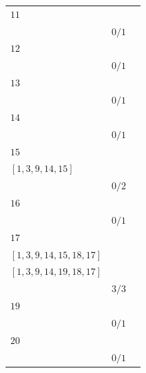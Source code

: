 \documentclass[12pt, a4paper]{extarticle}
\begin{document}
\begin{table}[h!]
\begin{tabularx}{\textwidth}{|X|X|X|}
        \hline
        $11$ & \begin{tabular}{@{}l@{}} $[1, 3, 6, 10, 11]$ \\ \end{tabular} & $0/1$ \\
        \hline
        $12$ & \begin{tabular}{@{}l@{}} $[1, 3, 9, 13, 12]$ \\ \end{tabular} & $0/1$ \\
        \hline
        $13$ & \begin{tabular}{@{}l@{}} $[1, 3, 9, 13]$ \\ \end{tabular} & $0/1$ \\
        \hline
        $14$ & \begin{tabular}{@{}l@{}} $[1, 3, 9, 14]$ \\ \end{tabular} & $0/1$ \\
        \hline
        $15$ & \begin{tabular}{@{}l@{}} $[1, 3, 9, 13, 15]$ \\  $[1, 3, 9, 14, 15]$ \\ \end{tabular} & $0/2$ \\
        \hline
        $16$ & \begin{tabular}{@{}l@{}} $[1, 3, 6, 10, 16]$ \\ \end{tabular} & $0/1$ \\
        \hline
        $17$ & \begin{tabular}{@{}l@{}} $[1, 3, 9, 13, 15, 18, 17]$ \\  $[1, 3, 9, 14, 15, 18, 17]$ \\  $[1, 3, 9, 14, 19, 18, 17]$ \\ \end{tabular} & $3/3$ \\
        \hline
        $19$ & \begin{tabular}{@{}l@{}} $[1, 3, 9, 14, 19]$ \\ \end{tabular} & $0/1$ \\
        \hline
        $20$ & \begin{tabular}{@{}l@{}} $[1, 3, 9, 14, 19, 20]$ \\ \end{tabular} & $0/1$ \\
        \hline
    \end{tabularx}
\end{table}
\end{document}
